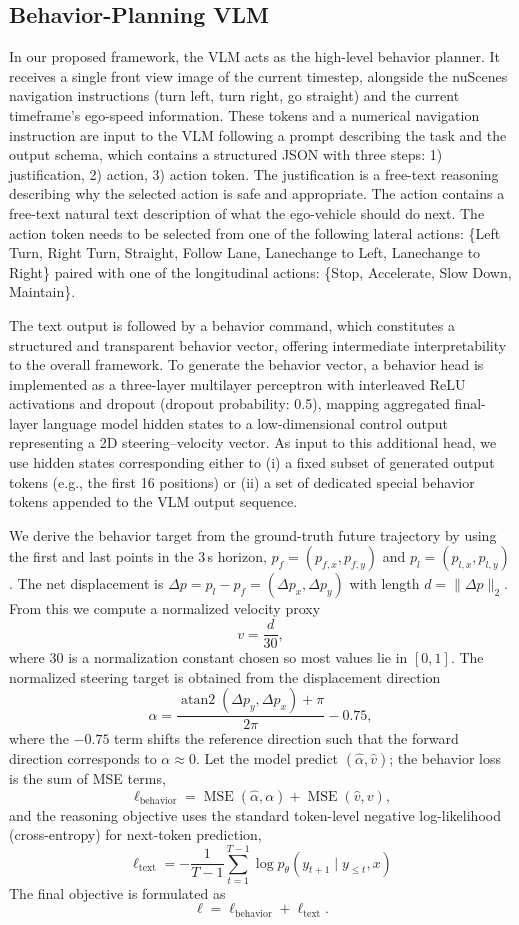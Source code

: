 \documentclass[letterpaper, 10 pt, conference]{ieeeconf}
\begin{document}
\subsection{Behavior-Planning VLM}
\label{subsec:behaviour}
In our proposed framework, the VLM acts as the high-level behavior planner. It receives a single front view image of the current timestep, alongside the nuScenes navigation instructions (turn left, turn right, go straight) and the current timeframe's ego-speed information.
These tokens and a numerical navigation instruction are input to the VLM following a prompt describing the task and the output schema, which contains a structured JSON with three steps: 1) justification, 2) action, 3) action token. 
The justification is a free-text reasoning describing why the selected action is safe and appropriate. The action contains a free-text natural text description of what the ego-vehicle should do next. 
The action token needs to be selected from one of the following lateral actions: \{Left Turn, Right Turn, Straight, Follow Lane, Lanechange to Left, Lanechange to Right\} paired with one of the longitudinal actions: \{Stop, Accelerate, Slow Down, Maintain\}. 

The text output is followed by a behavior command, which constitutes a structured and transparent behavior vector, offering intermediate interpretability to the overall framework. 
To generate the behavior vector, a behavior head is implemented as a three-layer multilayer perceptron with interleaved ReLU activations and dropout (dropout probability: 0.5), mapping aggregated final-layer language model hidden states to a low-dimensional control output representing a 2D steering–velocity vector. As input to this additional head, we use hidden states corresponding either to (i) a fixed subset of generated output tokens (e.g., the first 16 positions) or (ii) a set of dedicated special behavior tokens appended to the VLM output sequence.

We derive the behavior target from the ground-truth future trajectory by using the first and last points in the 3\,s horizon, $p_f=(p_{f,x},p_{f,y})$ and $p_l=(p_{l,x},p_{l,y})$. The net displacement is $\Delta p=p_l-p_f=(\Delta p_x,\Delta p_y)$ with length $d=\lVert \Delta p\rVert_2$. From this we compute a normalized velocity proxy
\[
v=\frac{d}{30},
\]
where $30$ is a normalization constant chosen so most values lie in $[0,1]$. The normalized steering target is obtained from the displacement direction
\[
\alpha=\frac{\operatorname{atan2}(\Delta p_y,\Delta p_x)+\pi}{2\pi}-0.75,
\]
where the $-0.75$ term shifts the reference direction such that the forward direction corresponds to $\alpha\approx 0$. Let the model predict $(\hat{\alpha},\hat{v})$; the behavior loss is the sum of MSE terms,
\[
\ell_{\text{behavior}}=\operatorname{MSE}(\hat{\alpha},\alpha)+\operatorname{MSE}(\hat{v},v),
\]
and the reasoning objective uses the standard token-level negative log-likelihood (cross-entropy) for next-token prediction,
\[
\ell_{\text{text}}
= -\frac{1}{T-1}\sum_{t=1}^{T-1}\log p_{\theta}\!\left(y_{t+1}\mid y_{\le t},x\right)
\]
The final objective is formulated as
\[
\ell=\ell_{\text{behavior}}+\ell_{\text{text}}.
\]
\end{document}
